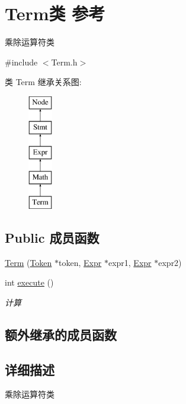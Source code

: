 \hypertarget{class_term}{}\section{Term类 参考}
\label{class_term}


乘除运算符类  




{\ttfamily \#include $<$Term.\+h$>$}

类 Term 继承关系图\+:\begin{figure}[H]
\begin{center}
\leavevmode
\includegraphics[height=5.000000cm]{class_term}
\end{center}
\end{figure}
\subsection*{Public 成员函数}
\begin{DoxyCompactItemize}
\item 
\hyperlink{class_term_aee8491368db463879893b7f374d5d835}{Term} (\hyperlink{class_token}{Token} $\ast$token, \hyperlink{class_expr}{Expr} $\ast$expr1, \hyperlink{class_expr}{Expr} $\ast$expr2)
\item 
\mbox{\label{class_term_ac2d20115da73f9425e5d390856a211a1}} 
int \hyperlink{class_term_ac2d20115da73f9425e5d390856a211a1}{execute} ()
\begin{DoxyCompactList}\small\item\em 计算 \end{DoxyCompactList}\end{DoxyCompactItemize}
\subsection*{额外继承的成员函数}


\subsection{详细描述}
乘除运算符类 

